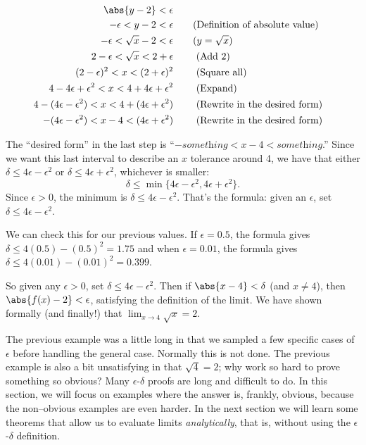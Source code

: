 {\begin{align*}
\abs{y - 2} < \epsilon \\
-\epsilon < y - 2 < \epsilon & \qquad \textrm{(Definition of absolute value)}\\
-\epsilon < \sqrt{x} - 2 < \epsilon  &\qquad\text{($y=\sqrt{x}$)}\\
2 - \epsilon < \sqrt{x} < 2+ \epsilon &\qquad \textrm{ (Add 2)}\\
(2 - \epsilon)^2 < x < (2+ \epsilon) ^2 &\qquad \textrm{ (Square all)}\\
4 - 4\epsilon + \epsilon^2 < x < 4 + 4\epsilon + \epsilon^2 &\qquad \textrm{ (Expand)}\\
4 - (4\epsilon - \epsilon^2) < x < 4 + (4\epsilon + \epsilon^2) &\qquad \textrm{ (Rewrite in the desired form)} \\
- (4\epsilon - \epsilon^2) < x-4 < (4\epsilon + \epsilon^2) &\qquad \textrm{ (Rewrite in the desired form)}
\end{align*}

The ``desired form'' in the last step is ``$-\textit{something} < x-4 < \textit{something}$.''
Since we want this last interval to describe an $x$ tolerance around 4, we have that either $\delta \leq 4\epsilon - \epsilon^2$ or $\delta \leq 4\epsilon + \epsilon^2$, whichever is smaller: \[\delta \leq \min\{4\epsilon - \epsilon^2, 4\epsilon + \epsilon^2\}\text{.}\]  Since $\epsilon > 0$, the minimum is $\delta \leq 4\epsilon - \epsilon^2$.  That's the formula: given an $\epsilon$, set $\delta \leq 4\epsilon-\epsilon^2$. 

We can check this for our previous values.  If $\epsilon=0.5$, the formula gives
$\delta \leq 4(0.5) - (0.5)^2 = 1.75$ and when $\epsilon=0.01$, the formula gives $\delta \leq 4(0.01) - (0.01)^2 = 0.399$.

So given any $\epsilon >0$, set $\delta \leq 4\epsilon - \epsilon^2$. Then if $\abs{x-4}<\delta$ (and $x\neq 4$), then $\abs{f(x) - 2} < \epsilon$,  satisfying the definition of the limit.  We have shown formally (and finally!) that $\displaystyle \lim_{x\rightarrow 4} \sqrt{x} = 2 $.}

The previous example was a little long in that we sampled a few specific cases of $\epsilon$ before handling the general case. Normally this is not done.  The previous example is also a bit unsatisfying in that $\sqrt{4}=2$; why work so hard to prove something so obvious? Many $\epsilon$-$\delta$ proofs are long and difficult to do. In this section, we will focus on examples where the answer is, frankly, obvious, because the non--obvious examples are even harder. In the next section we will learn some theorems that allow us to evaluate limits \textit{analytically}, that is, without using the $\epsilon$-$\delta$ definition.

